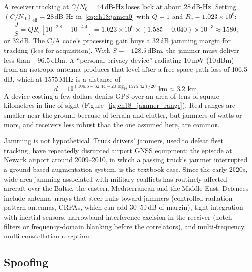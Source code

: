 
\begin{worked}
A receiver tracking at $C/N_0=44$\,dB-Hz loses lock at about 28\,dB-Hz. Setting
$(C/N_0)_{\text{eff}}=28$\,dB-Hz in~\eqref{eq:ch18:jamcn0} with $Q=1$ and $R_c=1.023\times10^6$:
\[
\frac JS=QR_c\left[10^{-2.8}-10^{-4.4}\right]=1.023\times10^6\times(1.585-0.040)\times10^{-3}\approx1580,
\]
or 32\,dB. The C/A code's processing gain buys a 32\,dB jamming margin for tracking (less for
acquisition). With $S=-128.5$\,dBm, the jammer must deliver less than $-96.5$\,dBm. A
``personal privacy device'' radiating 10\,mW (10\,dBm) from an isotropic antenna produces that
level after a free-space path loss of 106.5\,dB, which at 1575\,MHz is a distance of
\[
d=10^{(106.5-32.44-20\log_{10}1575.42)/20}\text{ km}\approx3.2\text{ km}.
\]
A device costing a few dollars denies GPS over an area of tens of square kilometres in line of
sight (Figure~\ref{fig:ch18_jammer_range}). Real ranges are smaller near the ground because of
terrain and clutter, but jammers of watts or more, and receivers less robust than the one assumed
here, are common.
\end{worked}

Jamming is not hypothetical. Truck drivers' jammers, used to defeat fleet tracking, have
repeatedly disrupted airport GNSS equipment; the episode at Newark airport around 2009--2010, in
which a passing truck's jammer interrupted a ground-based augmentation system, is the textbook
case. Since the early 2020s, wide-area jamming associated with military conflicts has
routinely affected aircraft over the Baltic, the eastern Mediterranean and the Middle East.
Defences include antenna arrays that steer nulls toward jammers (controlled-radiation-pattern
antennas, CRPAs, which can add 30--50\,dB of margin), tight integration with inertial sensors,
narrowband interference excision in the receiver (notch filters or frequency-domain blanking
before the correlators), and multi-frequency, multi-constellation reception.

\subsection{Spoofing}

